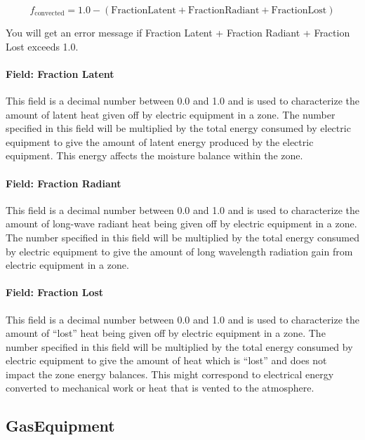 \begin{equation}
  f_{\mathrm{convected}} = 1.0 - (\mathrm{Fraction Latent} + \mathrm{Fraction Radiant} + \mathrm{Fraction Lost})
\end{equation}

You will get an error message if Fraction Latent + Fraction Radiant + Fraction Lost exceeds 1.0.

\paragraph{Field: Fraction Latent}\label{field-fraction-latent-ee-definition}

This field is a decimal number between 0.0 and 1.0 and is used to characterize the amount of latent heat given off by electric equipment in a zone. The number specified in this field will be multiplied by the total energy consumed by electric equipment to give the amount of latent energy produced by the electric equipment. This energy affects the moisture balance within the zone.

\paragraph{Field: Fraction Radiant}\label{field-fraction-radiant-2-ee-definition}

This field is a decimal number between 0.0 and 1.0 and is used to characterize the amount of long-wave radiant heat being given off by electric equipment in a zone. The number specified in this field will be multiplied by the total energy consumed by electric equipment to give the amount of long wavelength radiation gain from electric equipment in a zone.

\paragraph{Field: Fraction Lost}\label{field-fraction-lost-ee-definition}

This field is a decimal number between 0.0 and 1.0 and is used to characterize the amount of ``lost'' heat being given off by electric equipment in a zone. The number specified in this field will be multiplied by the total energy consumed by electric equipment to give the amount of heat which is ``lost'' and does not impact the zone energy balances. This might correspond to electrical energy converted to mechanical work or heat that is vented to the atmosphere.

\subsection{GasEquipment}\label{gasequipment}

